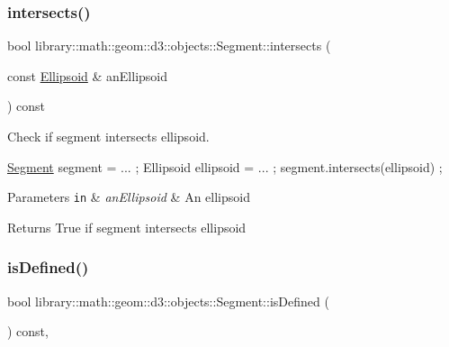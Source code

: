 \subsubsection{\texorpdfstring{intersects()}{intersects()}\hspace{0.1cm}{\footnotesize\ttfamily [2/2]}}
{\footnotesize\ttfamily bool library\+::math\+::geom\+::d3\+::objects\+::\+Segment\+::intersects (\begin{DoxyParamCaption}\item[{const \hyperlink{classlibrary_1_1math_1_1geom_1_1d3_1_1objects_1_1_ellipsoid}{Ellipsoid} \&}]{an\+Ellipsoid }\end{DoxyParamCaption}) const}



Check if segment intersects ellipsoid. 


\begin{DoxyCode}
\hyperlink{classlibrary_1_1math_1_1geom_1_1d3_1_1objects_1_1_segment_a5562342d1edf2f52e37ce1bc138ee7d7}{Segment} segment = ... ;
Ellipsoid ellipsoid = ... ;
segment.intersects(ellipsoid) ;
\end{DoxyCode}



\begin{DoxyParams}[1]{Parameters}
\mbox{\tt in}  & {\em an\+Ellipsoid} & An ellipsoid \\
\hline
\end{DoxyParams}
\begin{DoxyReturn}{Returns}
True if segment intersects ellipsoid 
\end{DoxyReturn}
\mbox{\label{classlibrary_1_1math_1_1geom_1_1d3_1_1objects_1_1_segment_a70a29c3822e4859a2e8cd4a52e1b26f5}} 
\subsubsection{\texorpdfstring{is\+Defined()}{isDefined()}}
{\footnotesize\ttfamily bool library\+::math\+::geom\+::d3\+::objects\+::\+Segment\+::is\+Defined (\begin{DoxyParamCaption}{ }\end{DoxyParamCaption}) const\hspace{0.3cm}{\ttfamily [override]}, {\ttfamily [virtual]}}



